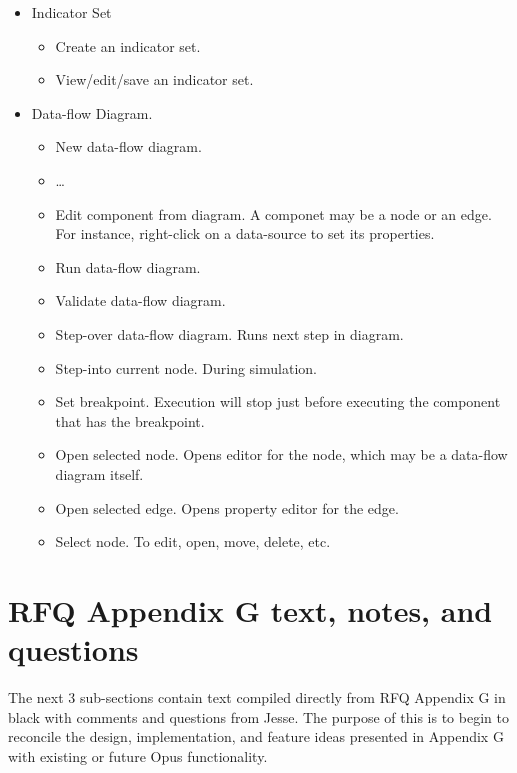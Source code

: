 \documentclass[titlepage]{article}
\begin{document}
\begin{itemize}
  \item Indicator Set 
  \begin{itemize}
	  \item Create an indicator set.
	  \item View/edit/save an indicator set.
  \end{itemize}
  
  \item Data-flow Diagram.  
  \begin{itemize}
    \item New data-flow diagram.
    \item \ldots
    \item Edit component from diagram.  A componet may be a node or an edge.  For instance, right-click on a data-source to set its properties.
    \item Run data-flow diagram.  
    \item Validate data-flow diagram.
    \item Step-over data-flow diagram.  Runs next step in diagram.
    \item Step-into current node.  During simulation.
    \item Set breakpoint.  Execution will stop just before executing the component that has the breakpoint.
    \item Open selected node.  Opens editor for the node, which may be a data-flow diagram itself.
    \item Open selected edge.  Opens property editor for the edge.
    \item Select node.  To edit, open, move, delete, etc.
  \end{itemize}
\end{itemize}

\section{RFQ Appendix G text, notes, and questions}
The next 3 sub-sections contain text compiled directly from RFQ Appendix G in black with comments and questions from Jesse.  The purpose of this is to begin to reconcile the design, implementation, and feature ideas presented in Appendix G with existing or future Opus functionality.
\end{document}
